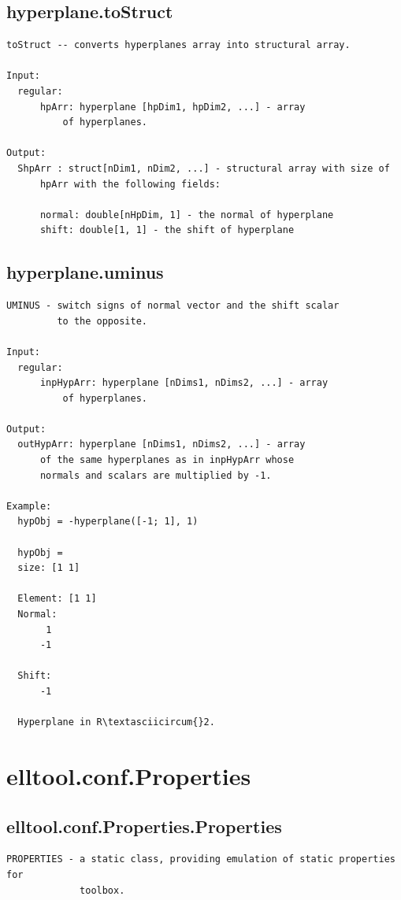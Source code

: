 \documentclass[letterpaper,10pt,english]{sphinxmanual}
\begin{document}
\subsection{hyperplane.toStruct}
\label{chap_functions:hyperplane-tostruct}
\begin{Verbatim}[commandchars=\\\{\}]
toStruct -- converts hyperplanes array into structural array.

Input:
  regular:
      hpArr: hyperplane [hpDim1, hpDim2, ...] - array
          of hyperplanes.

Output:
  ShpArr : struct[nDim1, nDim2, ...] - structural array with size of
      hpArr with the following fields:

      normal: double[nHpDim, 1] - the normal of hyperplane
      shift: double[1, 1] - the shift of hyperplane
\end{Verbatim}


\subsection{hyperplane.uminus}
\label{chap_functions:hyperplane-uminus}
\begin{Verbatim}[commandchars=\\\{\}]
UMINUS - switch signs of normal vector and the shift scalar
         to the opposite.

Input:
  regular:
      inpHypArr: hyperplane [nDims1, nDims2, ...] - array
          of hyperplanes.

Output:
  outHypArr: hyperplane [nDims1, nDims2, ...] - array
      of the same hyperplanes as in inpHypArr whose
      normals and scalars are multiplied by -1.

Example:
  hypObj = -hyperplane([-1; 1], 1)

  hypObj =
  size: [1 1]

  Element: [1 1]
  Normal:
       1
      -1

  Shift:
      -1

  Hyperplane in R\textasciicircum{}2.
\end{Verbatim}


\section{elltool.conf.Properties}
\label{chap_functions:elltool-conf-properties}

\subsection{elltool.conf.Properties.Properties}
\label{chap_functions:elltool-conf-properties-properties}
\begin{Verbatim}[commandchars=\\\{\}]
PROPERTIES - a static class, providing emulation of static properties for
             toolbox.
\end{Verbatim}
\end{document}
